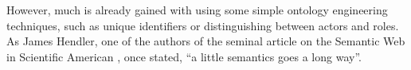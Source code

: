 However, much is already gained with using some simple ontology engineering techniques, such as unique identifiers or distinguishing between actors and roles. As James Hendler, one of the authors of the seminal article on the Semantic Web in Scientific American \cite{Berners-Lee2001}, once stated, ``a little semantics goes a long way''.





% 


% 

% 


